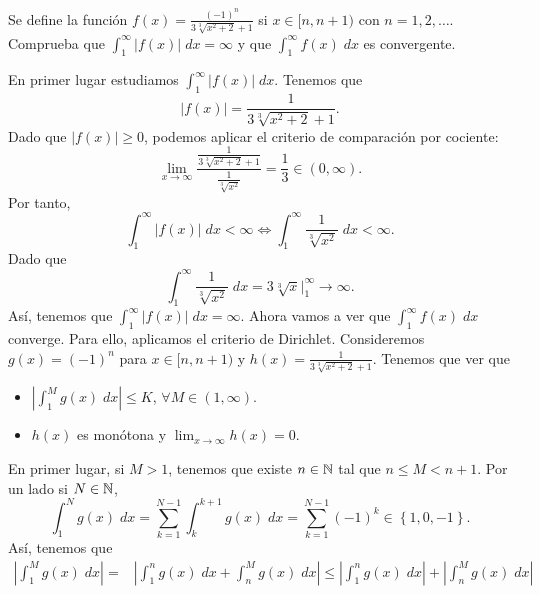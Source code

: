 \documentclass{article}
\begin{document}
\begin{ej}
	Se define la función $\displaystyle f\left(x\right) = \frac{\left(-1\right)^{n}}{3\sqrt[3]{x^{2}+2}+1} $ si $\displaystyle x \in [n, n+1) $ con $\displaystyle n = 1, 2, \ldots $. Comprueba que $\displaystyle \int^{\infty}_{1} \left|f\left(x\right)\right| \; dx= \infty $ y que $\displaystyle \int^{\infty}_{1} f\left(x\right) \; dx $ es convergente.
\end{ej}
\begin{sol}
En primer lugar estudiamos $\displaystyle \int^{\infty}_{1} \left|f\left(x\right)\right| \; dx $. Tenemos que 
\[ \left|f\left(x\right)\right| = \frac{1}{3\sqrt[3]{x^{2}+2}+1} .\]
Dado que $\displaystyle \left|f\left(x\right)\right| \geq 0 $, podemos aplicar el criterio de comparación por cociente:
\[\lim_{x \to \infty}\frac{\frac{1}{3\sqrt[3]{x^{2}+2}+1}}{\frac{1}{\sqrt[3]{x^{2}}}} = \frac{1}{3} \in \left(0,\infty\right) .\]
Por tanto, 
\[\int^{\infty}_{1} \left|f\left(x\right)\right| \; dx < \infty \iff \int^{\infty}_{1} \frac{1}{\sqrt[3]{x^{2}}} \; dx < \infty .\]
Dado que 
\[\int^{\infty}_{1} \frac{1}{\sqrt[3]{x^{2}}} \; dx = 3\sqrt[3]{x}|^{\infty}_{1} \to \infty .\]
Así, tenemos que $\displaystyle \int^{\infty}_{1} \left|f\left(x\right)\right| \; dx = \infty $. Ahora vamos a ver que $\displaystyle \int^{\infty}_{1} f\left(x\right) \; dx $ converge. Para ello, aplicamos el criterio de Dirichlet. Consideremos $\displaystyle g\left(x\right) = \left(-1\right)^{n} $ para $\displaystyle x \in [n, n+1) $ y $\displaystyle h\left(x\right) = \frac{1}{3\sqrt[3]{x^{2}+2}+1} $. Tenemos que ver que 
\begin{itemize}
\item $\displaystyle \left|\int^{M}_{1} g\left(x\right) \; dx\right| \leq K $, $\displaystyle \forall M \in \left(1,\infty\right) $.
\item $\displaystyle h\left(x\right) $ es monótona y $\displaystyle \lim_{x \to \infty}h\left(x\right) = 0 $.
\end{itemize}
En primer lugar, si $\displaystyle M > 1 $, tenemos que existe $\displaystyle n \in \mathbb{N} $ tal que $\displaystyle n \leq M < n + 1 $. Por un lado si $\displaystyle N \in \mathbb{N} $, 
\[\int^{N}_{1} g\left(x\right) \; dx = \sum^{N-1}_{k = 1}\int^{k+1}_{k} g\left(x\right) \; dx = \sum^{N-1}_{k=1}\left(-1\right)^{k} \in \left\{ 1, 0, - 1\right\}  .\]
Así, tenemos que
\[
\begin{split}
 \left|\int^{M}_{1} g\left(x\right) \; dx \right| = & \left|\int^{n}_{1} g\left(x\right) \; dx + \int^{M}_{n} g\left(x\right) \; dx\right| \leq \left|\int^{n}_{1} g\left(x\right) \; dx\right| + \left| \int^{M}_{n} g\left(x\right) \; dx\right| \\

\end{split}\]
\end{sol}
\end{document}
